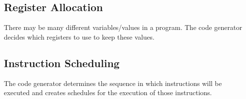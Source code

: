 \subsection{Register Allocation}
There may be many different variables/values in a program. The code generator decides which registers to use to keep these values.

\subsection{Instruction Scheduling}
The code generator determines the sequence in which instructions will be executed and creates schedules for the execution of those instructions.

